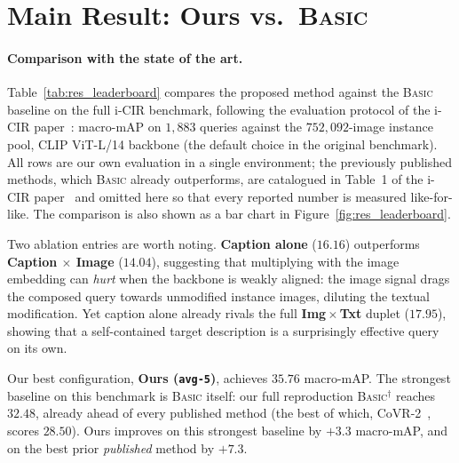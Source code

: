 \section{Main Result: Ours vs.\ \textsc{Basic}}\label{sect:res_main}

\paragraph{Comparison with the state of the art.}
Table~\ref{tab:res_leaderboard} compares the proposed method against the
\textsc{Basic} baseline on the full i-CIR benchmark, following the evaluation
protocol of the i-CIR paper~\cite{psomas2025icir}: macro-mAP on $1{,}883$ queries
against the $752{,}092$-image instance pool, CLIP ViT-L/14 backbone (the default
choice in the original benchmark). All rows are our own evaluation in a single
environment; the previously published methods, which \textsc{Basic} already
outperforms, are catalogued in Table~1 of the i-CIR paper~\cite{psomas2025icir}
and omitted here so that every reported number is measured like-for-like. The
comparison is also shown as a bar chart in Figure~\ref{fig:res_leaderboard}.

Two ablation entries are worth noting.
\textbf{Caption alone} ($16.16$) outperforms \textbf{Caption $\times$ Image}
($14.04$), suggesting that multiplying with the image embedding can
\emph{hurt} when the backbone is weakly aligned: the image signal drags the
composed query towards unmodified instance images, diluting the textual
modification. Yet caption alone already rivals the full
\textbf{Img\,$\times$\,Txt} duplet ($17.95$), showing that a self-contained
target description is a surprisingly effective query on its own.

Our best configuration, \textbf{Ours (\texttt{avg-5})}, achieves $35.76$
macro-mAP. The strongest baseline on this benchmark is \textsc{Basic} itself: our
full reproduction \textsc{Basic}$^\dagger$ reaches $32.48$, already ahead of
every published method (the best of which, CoVR-2~\cite{ventura2024covr}, scores
$28.50$). Ours improves
on this strongest baseline by $+3.3$ macro-mAP, and on the best prior
\emph{published} method by $+7.3$.


